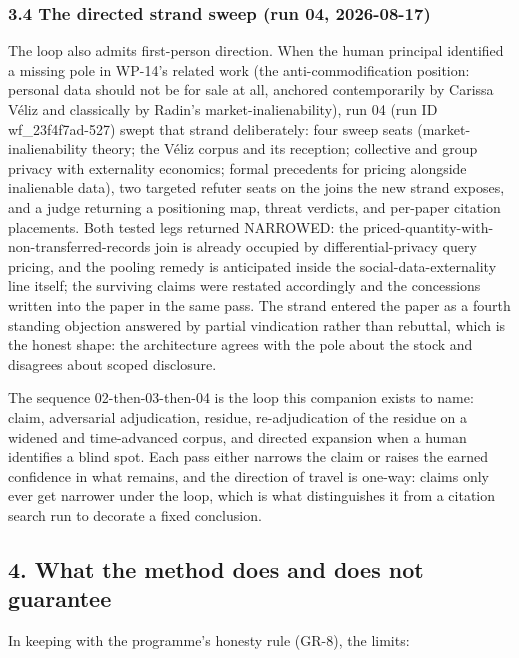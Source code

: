 \documentclass[
  11pt,
]{article}
\begin{document}
\subsubsection{3.4 The directed strand sweep (run 04,
2026-08-17)}\label{the-directed-strand-sweep-run-04-2026-08-17}

The loop also admits first-person direction. When the human principal
identified a missing pole in WP-14's related work (the
anti-commodification position: personal data should not be for sale at
all, anchored contemporarily by Carissa Véliz and classically by Radin's
market-inalienability), run 04 (run ID wf\_23f4f7ad-527) swept that
strand deliberately: four sweep seats (market-inalienability theory; the
Véliz corpus and its reception; collective and group privacy with
externality economics; formal precedents for pricing alongside
inalienable data), two targeted refuter seats on the joins the new
strand exposes, and a judge returning a positioning map, threat
verdicts, and per-paper citation placements. Both tested legs returned
NARROWED: the priced-quantity-with-non-transferred-records join is
already occupied by differential-privacy query pricing, and the pooling
remedy is anticipated inside the social-data-externality line itself;
the surviving claims were restated accordingly and the concessions
written into the paper in the same pass. The strand entered the paper as
a fourth standing objection answered by partial vindication rather than
rebuttal, which is the honest shape: the architecture agrees with the
pole about the stock and disagrees about scoped disclosure.

The sequence 02-then-03-then-04 is the loop this companion exists to
name: claim, adversarial adjudication, residue, re-adjudication of the
residue on a widened and time-advanced corpus, and directed expansion
when a human identifies a blind spot. Each pass either narrows the claim
or raises the earned confidence in what remains, and the direction of
travel is one-way: claims only ever get narrower under the loop, which
is what distinguishes it from a citation search run to decorate a fixed
conclusion.

\subsection{4. What the method does and does not
guarantee}\label{what-the-method-does-and-does-not-guarantee}

In keeping with the programme's honesty rule (GR-8), the limits:
\end{document}
